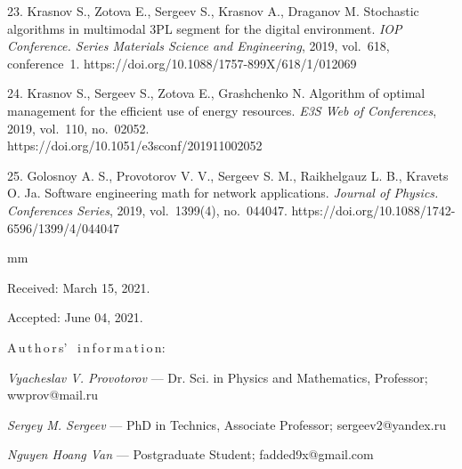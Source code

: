 {23. Krasnov S., Zotova E., Sergeev S., Krasnov A., Draganov M. Stochastic algorithms in multimodal 3PL segment for the digital environment. {\it IOP Conference. Series Materials Science and Engineering}, 2019, vol.~618, conference~1.
https://doi.org/10.1088/1757-899X/618/1/012069

24. Krasnov S., Sergeev S., Zotova E., Grashchenko N. Algorithm of optimal management for the efficient use of energy resources. {\it E3S Web of Conferences}, 2019, vol.~110, no.~02052.\\  https://doi.org/10.1051/e3sconf/201911002052

25. Golosnoy A. S., Provotorov V. V., Sergeev S. M., Raikhelgauz L. B., Kravets O. Ja. Software engineering math for network applications. {\it Journal of Physics. Conferences Series}, 2019, vol.~1399(4), no.~044047.
https://doi.org/10.1088/1742-6596/1399/4/044047


mm

%


Received:  March 15, 2021.

Accepted: June 04, 2021.

\vskip 6mm


A\,u\,t\,h\,o\,r\,s' \ i\,n\,f\,o\,r\,m\,a\,t\,i\,o\,n:


\vskip 2mm \textit{Vyacheslav V. Provotorov} --- Dr. Sci. in Physics and Mathematics, Professor;  wwprov@mail.ru \par

\vskip 2mm \textit{Sergey M. Sergeev} ---  PhD in Technics, Associate Professor;   sergeev2@yandex.ru \par


\vskip 2mm \textit{Nguyen Hoang Van} --- Postgraduate Student; fadded9x@gmail.com \par
%
%
}

